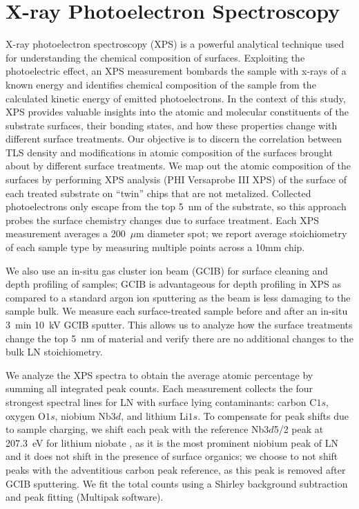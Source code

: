 \documentclass[
 prapplied,
 amsmath,amssymb,
 reprint, longbibliography, superscriptaddress
]{revtex4-2}
\begin{document}
\section{X-ray Photoelectron Spectroscopy}

X-ray photoelectron spectroscopy (XPS) is a powerful analytical technique used for understanding the chemical composition of surfaces. Exploiting the photoelectric effect, an XPS measurement bombards the sample with x-rays of a known energy and identifies chemical composition of the sample from the calculated kinetic energy of emitted photoelectrons. In the context of this study, XPS provides valuable insights into the atomic and molecular constituents of the substrate surfaces, their bonding states, and how these properties change with different surface treatments. Our objective is to discern the correlation between TLS density and  modifications in atomic composition of the surfaces brought about by different surface treatments. We map out the atomic composition of the surfaces by performing XPS analysis (PHI Versaprobe III XPS) of the surface of each treated substrate on ``twin'' chips that are not metalized.  Collected photoelectrons only escape from the top 5~nm of the substrate, so this approach probes the surface chemistry changes due to surface treatment. Each XPS measurement averages a 200~$\mu\text{m}$ diameter spot; we report average stoichiometry of each sample type by measuring multiple points across a 10mm chip.

We also use an in-situ gas cluster ion beam (GCIB) for surface cleaning and depth profiling of samples; GCIB is advantageous for depth profiling in XPS as compared to a standard argon ion sputtering as the beam is less damaging to the sample bulk. We measure each surface-treated sample before and after an in-situ 3~min 10~kV GCIB sputter. This allows us to analyze how the surface treatments change the top 5~nm of material and verify there are no additional changes to the bulk LN stoichiometry. 

We analyze the XPS spectra to obtain the average atomic percentage by summing all integrated peak counts. Each measurement collects the four strongest spectral lines for LN with surface lying contaminants: carbon C$1s$, oxygen O$1s$, niobium Nb$3d$, and lithium Li$1s$. To compensate for peak shifts due to sample charging, we shift each peak with the reference Nb$3d$5/2 peak at 207.3~eV for lithium niobate \cite{kaufherr1996x, nist2000nist}, as it is the most prominent niobium peak of LN and it does not shift in the presence of surface organics; we choose to not shift peaks with the adventitious carbon peak reference, as this peak is removed after GCIB sputtering. We fit the total counts using a Shirley background subtraction and peak fitting (Multipak software). 
\end{document}
